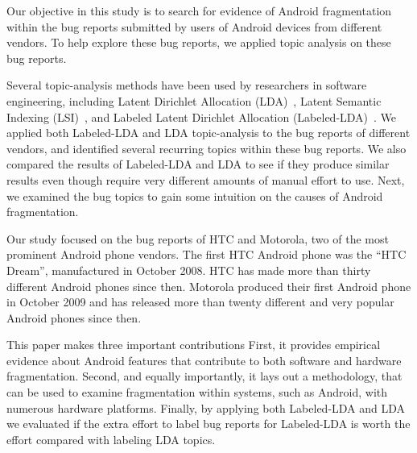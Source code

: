 \documentclass[10pt, conference, compsocconf]{IEEEtran}
\begin{document}
Our objective in this study is to search for evidence of
Android
fragmentation within the bug reports submitted by users of Android devices
from different vendors. To help explore these bug reports, we applied topic analysis on these
bug reports. 

Several topic-analysis methods have been used by researchers in
software engineering, including Latent Dirichlet Allocation
(LDA)~\cite{Asuncion:2010,Linstead:2009}, 
Latent Semantic Indexing (LSI)~\cite{Marcus04aninformation}, 
and Labeled Latent Dirichlet Allocation
(Labeled-LDA)~\cite{labeledlda}. We applied both
Labeled-LDA and LDA topic-analysis to the bug reports
of different vendors, and identified several recurring topics within these
bug reports. 
We also compared the results of Labeled-LDA and LDA to see if they
produce similar results even though require very different amounts of
manual effort to use.
Next, we examined the bug topics to gain some intuition on the
causes of Android fragmentation.	

Our study focused on the bug reports of HTC and Motorola, two of the
most prominent Android phone vendors. The first HTC Android phone was
the ``HTC Dream'', manufactured in October 2008. HTC has made more than
thirty different Android phones since then. Motorola produced their
first Android phone in October 2009 and has released more than twenty
different and very popular Android phones since then. 
 
This paper makes three important contributions First, it provides
empirical evidence about Android features that contribute to both software
and hardware fragmentation. Second, and equally importantly, it lays
out a methodology, that can be used to examine fragmentation within
systems, such as Android, with numerous hardware platforms. Finally,
by applying both Labeled-LDA and LDA we evaluated if the extra effort
to label bug reports for Labeled-LDA is worth the effort compared with
labeling LDA topics.
\end{document}
